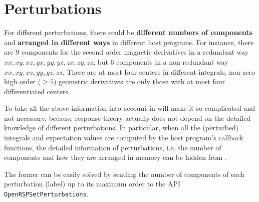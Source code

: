 \nwendcode{}\section{Perturbations}
\label{section-OpenRSP-perturbations}

For different perturbations, there could be \textbf{different numbers of
components} and \textbf{arranged in different ways} in different host programs.
For instance, there are 9 components for the second order magnetic derivatives
in a redundant way $xx,xy,xz,yx,yy,yz,zx,zy,zz$, but 6 components in a
non-redundant way $xx,xy,xz,yy,yz,zz$. There are at most four centers in
different integrals, non-zero high order ($\ge 5$) geometric derivatives are
only those with at most four differentiated centers.

To take all the above information into account in \LibName will make it so
complicated and not necessary, because response theory actually does not
depend on the detailed knowledge of different perturbations. In particular,
when all the (perturbed) integrals and expectation values are computed by
the host program's callback functions, the detailed information of perturbations,
i.e. the number of components and how they are arranged in memory can be
hidden from \LibName.

The former can be easily solved by sending the number of components of
each perturbation (label) up to its maximum order to the \LibName API
{\tt{}OpenRSPSetPerturbations}.

